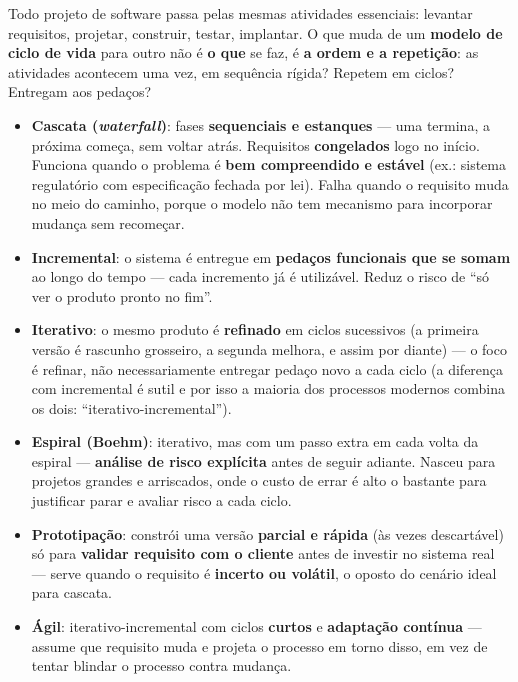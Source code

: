 \begin{conceito}
Todo projeto de software passa pelas mesmas atividades essenciais:
levantar requisitos, projetar, construir, testar, implantar. O que muda de
um \textbf{modelo de ciclo de vida} para outro não é \textbf{o que} se faz,
é \textbf{a ordem e a repetição}: as atividades acontecem uma vez, em
sequência rígida? Repetem em ciclos? Entregam aos pedaços?

\begin{itemize}
\item \textbf{Cascata (\textit{waterfall})}: fases \textbf{sequenciais e
estanques} --- uma termina, a próxima começa, sem voltar atrás.
Requisitos \textbf{congelados} logo no início. Funciona quando o problema é
\textbf{bem compreendido e estável} (ex.: sistema regulatório com
especificação fechada por lei). Falha quando o requisito muda no meio do
caminho, porque o modelo não tem mecanismo para incorporar mudança sem
recomeçar.
\item \textbf{Incremental}: o sistema é entregue em \textbf{pedaços
funcionais que se somam} ao longo do tempo --- cada incremento já é
utilizável. Reduz o risco de “só ver o produto pronto no fim”.
\item \textbf{Iterativo}: o mesmo produto é \textbf{refinado} em ciclos
sucessivos (a primeira versão é rascunho grosseiro, a segunda melhora, e
assim por diante) --- o foco é refinar, não necessariamente entregar pedaço
novo a cada ciclo (a diferença com incremental é sutil e por isso a maioria
dos processos modernos combina os dois: “iterativo-incremental”).
\item \textbf{Espiral (Boehm)}: iterativo, mas com um passo extra em cada
volta da espiral --- \textbf{análise de risco explícita} antes de seguir
adiante. Nasceu para projetos grandes e arriscados, onde o custo de errar é
alto o bastante para justificar parar e avaliar risco a cada ciclo.
\item \textbf{Prototipação}: constrói uma versão \textbf{parcial e rápida}
(às vezes descartável) só para \textbf{validar requisito com o cliente}
antes de investir no sistema real --- serve quando o requisito é
\textbf{incerto ou volátil}, o oposto do cenário ideal para cascata.
\item \textbf{Ágil}: iterativo-incremental com ciclos \textbf{curtos} e
\textbf{adaptação contínua} --- assume que requisito muda e projeta o
processo em torno disso, em vez de tentar blindar o processo contra
mudança.
\end{itemize}
\end{conceito}


